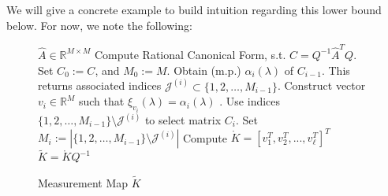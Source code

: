 \documentclass[letterpaper,12pt,peerreviewca,draftcls]{IEEEtran}
\newcommand{\la}{\lambda}
\newcommand{\R}{\mathbb{R}}
\newcommand{\eval}{\la}
\newcommand{\empK}{\ensuremath{K}}
\newcommand{\ncent}{M}
\newcommand{\minpoly}{\alpha}
\newcommand{\minpolyv}{\xi}
\newcommand{\linvec}{v}
\newcommand{\minmeas}{\ell}
\newcommand{\measmap}{\widetilde{\empK}}
\newcommand{\premeasmap}{\mathring{\empK}}
\newcommand{\mmapInd}[1]{\mathcal{J}^{({#1})}}
\newcommand{\dualop}{A}
\newcommand{\dualopApprox}{\widehat{\dualop}}
\newcommand{\FrobP}{Q}
\newcommand{\FrobC}{C}
\begin{document}
We will give a concrete example to build intuition regarding this lower bound below. For now, we note the following:
\begin{figure}[t!]
	\begin{algorithm}[H]
		\caption{Measurement Map $\measmap$}
		\label{alg:measmap}
		\begin{algorithmic}
				 $\dualopApprox\in\R^{\ncent\times\ncent}$
				\STATE Compute Rational Canonical Form, s.t. $\FrobC = \FrobP^{-1}\dualopApprox^T\FrobP$. Set $\FrobC_0:=\FrobC$, and
				$\ncent_0:=\ncent$. 
				\FOR{$i=1$ {\bfseries to} $\minmeas$}
				\STATE Obtain (m.p.) $\minpoly_i(\eval)$ of $\FrobC_{i-1}$. 
				This returns associated indices $\mmapInd{i}\subset\{1,2,\dots,\ncent_{i-1}\}$. 
				\STATE Construct vector $\linvec_i \in \R^{\ncent}$ such that 
				$\minpolyv_{\linvec_i}(\eval)=\minpoly_{i}(\eval)$ .
				\STATE Use indices $\{1,2,\dots,\ncent_{i-1}\}\setminus\mmapInd{i}$ to select matrix $\FrobC_i$. Set 
				$\ncent_i:= |\{1,2,\dots,\ncent_{i-1}\}\setminus\mmapInd{i}|$
				\ENDFOR
				\STATE Compute $ \premeasmap = [\linvec_1^T, \linvec_2^T,...,\linvec_{\minmeas}^T]^T$
				 $\measmap =\premeasmap\FrobP^{-1}$
		\end{algorithmic}
	\end{algorithm}
\end{figure}
\end{document}
